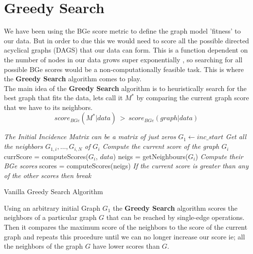 \documentclass{article}
\begin{document}
	\section{Greedy Search}
	We have been using the BGe score metric to define the graph model 'fitness'
	to our data. But in order to due this we would need to score all the possible
	directed acyclical graphs (DAGS) that our data can form. This is a function
	dependent on the number of nodes in our data grows super exponentially
	\cite{bnsBasics}, so searching for all possible BGe scores would be a
	non-computationally feasible task. This is where the \textbf{Greedy Search}
	algorithm comes to play. 
	\\
	The main idea of the \textbf{Greedy Search} algorithm is to heuristically
	search for the best graph that fits the data, lets call it $M^{*}$ by
	comparing the current graph score that we have to its neighbors.
	\begin{equation}
		score_{BGe}(M^{*}|data) \ > \ score_{BGe}(graph | data)
		\label{eq:5}
	\end{equation}
	\begin{algorithm}[H]
	\SetAlgoLined
	\emph{The Initial Incidence Matrix can be a matrix of just zeros}\;
	$G_{1} \gets inc\_start$\;	
	\emph{Get all the neighbors $G_{1,i},\dots,G_{i,N}$ of $G_{i}$}\;	
	 {
	\emph{Compute the current score of the graph $G_{i}$}\;
	currScore = computeScores($G_{i}$, $data$)\;
	neigs = getNeighbours($G_i$)\;	
	\emph{Compute their BGe scores}\;
	scores = computeScores(neigs)\;
	\emph{If the current score is greater than any of the other scores then
	break}\;
	}
	\caption{Vanilla Greedy Search Algorithm}
	\label{alg:greedy}
	\end{algorithm}		
	Using an arbitrary initial Graph $G_{1}$ the \textbf{Greedy Search} algorithm
	scores the neighbors of a particular
	graph $G$ that can be reached by single-edge operations. Then it compares the
	maximum score of the neighbors to the score of the current graph and repeats
	this procedure until we can no longer increase our score ie; all the
	neighbors of the graph $G$ have lower scores than $G$.
\end{document}
